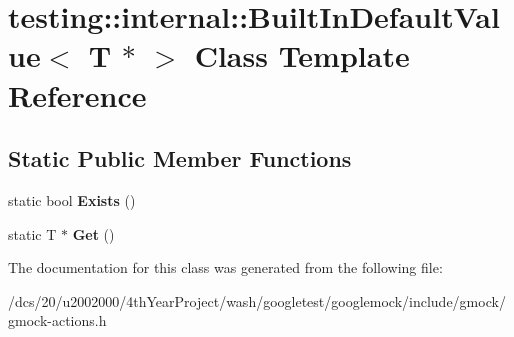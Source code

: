 \hypertarget{classtesting_1_1internal_1_1BuiltInDefaultValue_3_01T_01_5_01_4}{}\section{testing\+:\+:internal\+:\+:Built\+In\+Default\+Value$<$ T $\ast$ $>$ Class Template Reference}
\label{classtesting_1_1internal_1_1BuiltInDefaultValue_3_01T_01_5_01_4}
\subsection*{Static Public Member Functions}
\begin{DoxyCompactItemize}
\item 
\mbox{\label{classtesting_1_1internal_1_1BuiltInDefaultValue_3_01T_01_5_01_4_aafa7172f63d068305fb37d5db40bb543}} 
static bool {\bfseries Exists} ()
\item 
\mbox{\label{classtesting_1_1internal_1_1BuiltInDefaultValue_3_01T_01_5_01_4_adc2fa2bdae767589d171ae3a117e3a9f}} 
static T $\ast$ {\bfseries Get} ()
\end{DoxyCompactItemize}


The documentation for this class was generated from the following file\+:\begin{DoxyCompactItemize}
\item 
/dcs/20/u2002000/4th\+Year\+Project/wash/googletest/googlemock/include/gmock/gmock-\/actions.\+h\end{DoxyCompactItemize}
